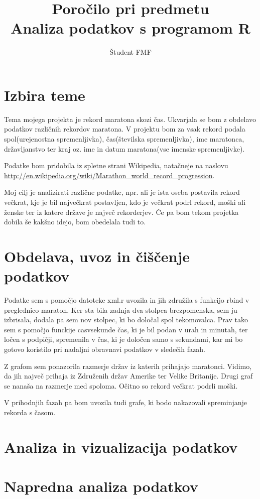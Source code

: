 \documentclass[11pt,a4paper]{article}
\begin{document}
\title{Poročilo pri predmetu \\
Analiza podatkov s programom R}
\author{Študent FMF}
\maketitle

\section{Izbira teme}

Tema mojega projekta je rekord maratona skozi čas. Ukvarjala se bom z obdelavo podatkov različnih rekordov maratona. V projektu bom za vsak rekord podala spol(urejenostna spremenljivka), čas(številska spremenljivka), ime maratonca, državljanstvo ter kraj oz. ime in datum maratona(vse imenske spremenljivke).

Podatke bom pridobila iz spletne strani Wikipedia, natačneje na naslovu \url{http://en.wikipedia.org/wiki/Marathon_world_record_progression}.

Moj cilj je analizirati različne podatke, npr. ali je ista oseba postavila rekord večkrat, kje je bil največkrat postavljen, kdo je večkrat podrl rekord, moški ali ženske ter iz katere države je največ rekorderjev. Če pa bom tekom projetka dobila še kakšno idejo, bom obedelala tudi to.

\section{Obdelava, uvoz in čiščenje podatkov}

Podatke sem s pomočjo datoteke xml.r uvozila in jih združila s funkcijo rbind v preglednico maraton. Ker sta bila zadnja dva stolpca brezpomenska, sem ju izbrisala, dodala pa sem nov stolpec, ki bo določal spol tekomovalca. Prav tako sem s pomočjo funckije casvsekunde čas, ki je bil podan v urah in minutah, ter ločen s podpičji, spremenila v čas, ki je določen samo s sekundami, kar mi bo gotovo koristilo pri nadaljni obravnavi podatkov v sledečih fazah.

Z grafom sem ponazorila razmerje držav iz katerih prihajajo maratonci. Vidimo, da jih največ prihaja iz Združenih držav Amerike ter Velike Britanije.
Drugi graf se nanaša na razmerje med spoloma. Očitno so rekord večkrat podrli moški. 

V prihodnjih fazah pa bom uvozila tudi grafe, ki bodo nakazovali spreminjanje rekorda s časom.



\section{Analiza in vizualizacija podatkov}


\section{Napredna analiza podatkov}

\end{document}
